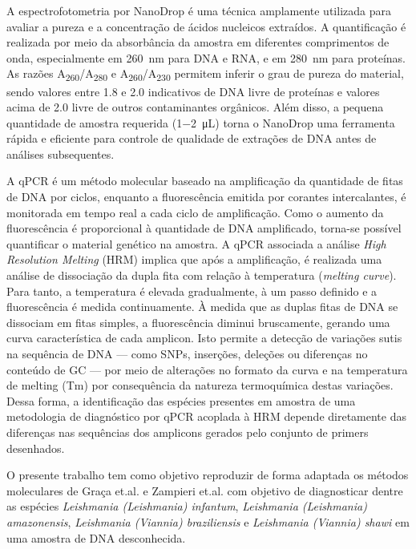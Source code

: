 A espectrofotometria por NanoDrop é uma técnica amplamente utilizada para
avaliar a pureza e a concentração de ácidos nucleicos extraídos. A quantificação
é realizada por meio da absorbância da amostra em diferentes comprimentos de
onda, especialmente em \qty{260}{\nano\meter} para DNA e RNA, e em 
\qty{280}{\nano\meter} para proteínas. As razões
A\textsubscript{260}/A\textsubscript{280} e
A\textsubscript{260}/A\textsubscript{230} permitem inferir o grau de pureza do
material, sendo valores entre \num{1.8} e \num{2.0} indicativos de DNA livre de
proteínas e valores acima de \num{2.0} livre de outros contaminantes
orgânicos\cite{nanodrop}. Além disso, a pequena quantidade de amostra requerida
(\qty{1-2}{\micro\liter}) torna o NanoDrop uma ferramenta rápida e eficiente para
controle de qualidade de extrações de DNA antes de análises subsequentes.

A qPCR é um método molecular baseado na amplificação da quantidade de fitas de
DNA por ciclos, enquanto a fluorescência emitida por corantes intercalantes, é
monitorada em tempo real a cada ciclo de amplificação.  Como o aumento da
fluorescência é proporcional à quantidade de DNA amplificado, torna-se possível
quantificar o material genético na amostra\cite{Galluzi2018}.  A qPCR associada
a análise \textit{High Resolution Melting} (HRM) implica que após a
amplificação, é realizada uma análise de dissociação da dupla fita com relação à
temperatura (\textit{melting curve}). Para tanto, a temperatura é elevada
gradualmente, à um passo definido e a fluorescência é medida continuamente. À
medida que as duplas fitas de DNA se dissociam em fitas simples, a fluorescência
diminui bruscamente, gerando uma curva característica de cada amplicon. Isto
permite a detecção de variações sutis na sequência de DNA — como SNPs, inserções, deleções ou diferenças no conteúdo de GC
— por meio de alterações no formato da curva e na temperatura de melting
(Tm)\cite{Wittwer2009} por consequência da natureza termoquímica destas
variações. Dessa forma, a identificação das espécies presentes em amostra de uma
metodologia de diagnóstico por qPCR acoplada à HRM depende diretamente das
diferenças nas sequências dos amplicons gerados pelo conjunto de primers
desenhados. 

O presente trabalho tem como objetivo reproduzir de forma adaptada os métodos
moleculares de Graça et.al.\cite{RFLPgraca2012} e Zampieri
et.al.\cite{HRMzampi2016} com objetivo de diagnosticar dentre as espécies
\textit{Leishmania (Leishmania) infantum}, \textit{Leishmania (Leishmania)
amazonensis}, \textit{Leishmania (Viannia) braziliensis} e \textit{Leishmania
(Viannia) shawi} em uma amostra de DNA desconhecida. 
